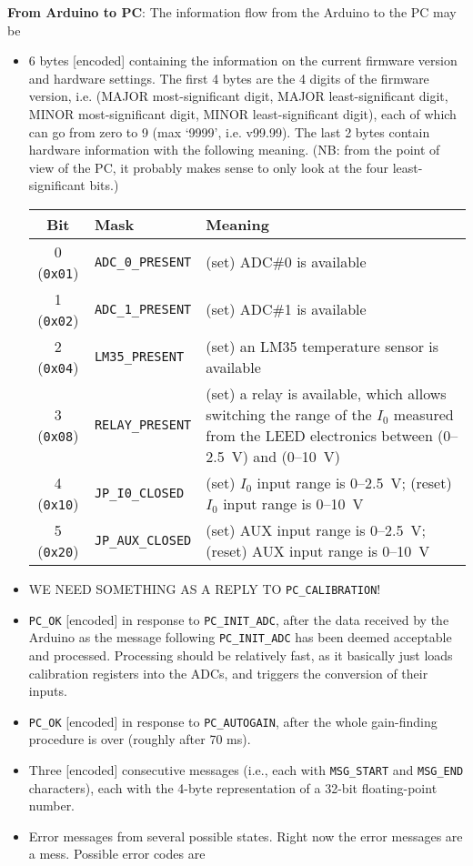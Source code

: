 \documentclass[11pt,a4paper,english]{article}
\begin{document}
\clearpage
\noindent\textbf{From Arduino to PC}: The information flow from the Arduino to the PC may be
\begin{itemize}
\item 6 bytes [encoded] containing the information on the current firmware version and hardware settings. The first 4 bytes are the 4 digits of the firmware version, i.e. (MAJOR most-significant digit, MAJOR least-significant digit, MINOR most-significant digit, MINOR least-significant digit), each of which can go from zero to 9 (max `9999', i.e. v99.99). The last 2 bytes contain hardware information with the following meaning. (NB: from the point of view of the PC, it probably makes sense to only look at the four least-significant bits.)
	  \begin{center}
	  \begin{tabular}{clp{}}\toprule
	  Bit 				 & Mask                     & Meaning\\
	  \midrule
	  0 (\texttt{0x01})  & \texttt{ADC\_0\_PRESENT} & (set) ADC\#0 is available \\
	  1 (\texttt{0x02})  & \texttt{ADC\_1\_PRESENT} & (set) ADC\#1 is available \\
	  2 (\texttt{0x04})  & \texttt{LM35\_PRESENT}   & (set) an LM35 temperature sensor is available \\
	  3 (\texttt{0x08})  & \texttt{RELAY\_PRESENT}  & (set) a relay is available, which allows switching the range of the $I_0$ measured from the LEED electronics between (0--2.5~V) and (0--10~V)\\
	  4 (\texttt{0x10})  & \texttt{JP\_I0\_CLOSED}  & (set) $I_0$ input range is 0--2.5~V; (reset) $I_0$ input range is 0--10~V\\
	  5 (\texttt{0x20})  & \texttt{JP\_AUX\_CLOSED} & (set) AUX input range is 0--2.5~V; (reset) AUX input range is 0--10~V\\
	  \bottomrule
	  \end{tabular}
	  \end{center}
\item WE NEED SOMETHING AS A REPLY TO \texttt{PC\_CALIBRATION}! 
\item \texttt{PC\_OK} [encoded] in response to \texttt{PC\_INIT\_ADC}, after the data received by the Arduino as the message following \texttt{PC\_INIT\_ADC} has been deemed acceptable and processed. Processing should be relatively fast, as it basically just loads calibration registers into the ADCs, and triggers the conversion of their inputs.
\item \texttt{PC\_OK} [encoded] in response to \texttt{PC\_AUTOGAIN}, after the whole gain-finding procedure is over (roughly after 70 ms).
\item Three [encoded] consecutive messages (i.e., each with \texttt{MSG\_START} and \texttt{MSG\_END} characters), each with the 4-byte representation of a 32-bit floating-point number.
\item Error messages from several possible states. Right now the error messages are a mess. Possible error codes are


\end{itemize}
\end{document}
